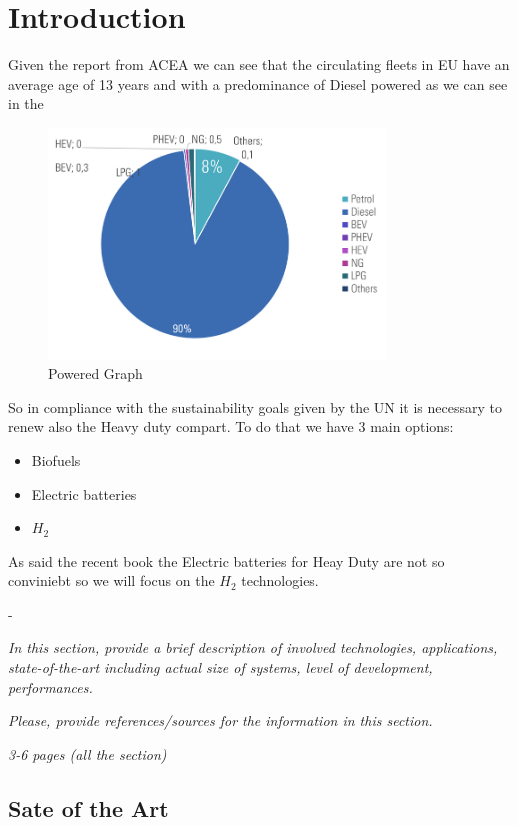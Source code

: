 \newpage
\chapter{Introduction}
Given the report from ACEA \cite{ACEA2021} we can see that the circulating fleets in EU have an average age of 13 years and with a predominance of Diesel powered as we can see in the 


\begin{figure}[h]
\centering
\includegraphics[width=0.8\textwidth]{Chapters/Pictures/grafico_diesel.png}
\caption{Powered Graph}
\label{fig:hdpower}
\end{figure}



So in compliance with the sustainability goals given by the UN it is necessary to renew also the Heavy duty compart. To do that we have 3 main options:
\begin{itemize}
    \item Biofuels
    \item Electric batteries
    \item $H_2$
\end{itemize}
As said the recent book \cite{Mazzo2021} the Electric batteries for Heay Duty are not so conviniebt so we will focus on the $H_2$ technologies.

-

\textit{In this section, provide a brief description of involved technologies, applications, state-of-the-art including actual size of systems, level of development, performances.}

\textit{Please, provide references/sources for the information in this section.}

\textit{3-6 pages (all the section)}

\section{Sate of the Art}